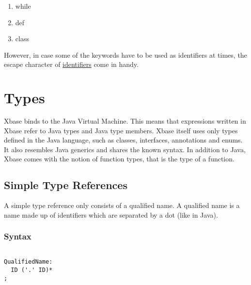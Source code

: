 \documentclass[a4paper,10pt]{scrreprt}
\newlength{\itemindentlen}
\begin{document}
\begin{enumerate}
\item \begin{minipage}[t]{\itemindentlen}
while
\end{minipage}

\item \begin{minipage}[t]{\itemindentlen}
def
\end{minipage}

\item \begin{minipage}[t]{\itemindentlen}
class
\end{minipage}

\end{enumerate}
\addtolength{\itemindentlen}{2em}


However, in case some of the keywords have to be used as identifiers at times, the escape character of 
\hyperref[Identifiers]{identifiers} come in handy. 





\chapter{Types}
\label{Types}

Xbase binds to the Java Virtual Machine. This means that expressions written in Xbase refer to Java types and Java type members. Xbase itself uses only types 
defined in the Java language, such as classes, interfaces, annotations and enums. It also resembles Java generics and shares the known syntax. In addition to Java, Xbase comes with the
notion of function types, that is the type of a function. 

\section{Simple Type References}
\label{TypeReferences}

A simple type reference only consists of a qualified name. A qualified name is a name made up of identifiers which are separated by a dot (like in Java).

\subsection{ Syntax }


\begin{lstlisting}

QualifiedName:
  ID ('.' ID)*
;	

\end{lstlisting}
\end{document}
